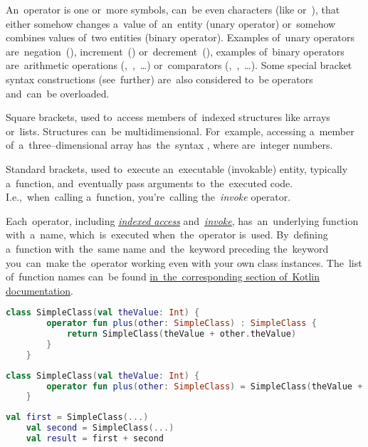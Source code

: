 \label{kotlinoperator}
An~operator is one or~more symbols, can~be even characters (like  \mbox{or }), that either somehow changes a~value of~an~entity (unary operator) or~somehow combines values of~two entities (binary operator).
Examples of~unary operators are~negation~(\itq{!}), increment~(\itq{++}) or~decrement~(\itq{-{}-}), examples of~binary operators are~arithmetic operations \mbox{(\itq{+}, \itq{-}, \dots)} or~comparators \mbox{(\itq{<}, \itq{>}, \dots)}.
Some special bracket syntax constructions (see~further) are~also considered to~be operators and~can~be overloaded.

\label{kotlinindexedaccess}
Square brackets, used to~access members of~indexed structures like arrays or~lists.
Structures can~be multidimensional.
For~example, accessing a~member of~a~three--dimensional array has~the~syntax \mbox{,} where  are~integer numbers.

\label{kotlininvoke}
Standard brackets, used to~execute an~executable (invokable) entity, typically a~function, and~eventually pass arguments to~the~executed code.
I.e.,~when~calling a~function, you're~calling the~\textit{invoke} operator.
\newpage

\label{kotlinoperatoroverload}
Each~operator, including \hyperref[kotlinindexedaccess]{\textit{indexed access}} \mbox{and \hyperref[kotlininvoke]{\textit{invoke}},} has~an~underlying function with~a~name, which~is~executed when~the~operator is~used.
By~defining a~function with~the~same name and~the~keyword  preceding the~keyword you~can~make the~operator working even with your own class instances.
The~list of~function names can~be found \href{https://kotlinlang.org/docs/reference/operator-overloading.html}{in~the~corresponding section of~Kotlin documentation}.

\begin{lstlisting}[language=Kotlin, title={Custom class with the operator overloading}]
    class SimpleClass(val theValue: Int) {
        operator fun plus(other: SimpleClass) : SimpleClass {
            return SimpleClass(theValue + other.theValue)
        }
    }
\end{lstlisting}

\begin{lstlisting}[language=Kotlin, title={Equivalent with direct assignment simplification}]
    class SimpleClass(val theValue: Int) {
        operator fun plus(other: SimpleClass) = SimpleClass(theValue + other.theValue)
    }
\end{lstlisting}
\begin{lstlisting}[language=Kotlin, title={Usage}]
    val first = SimpleClass(...)
    val second = SimpleClass(...)
    val result = first + second
\end{lstlisting}
\newline

